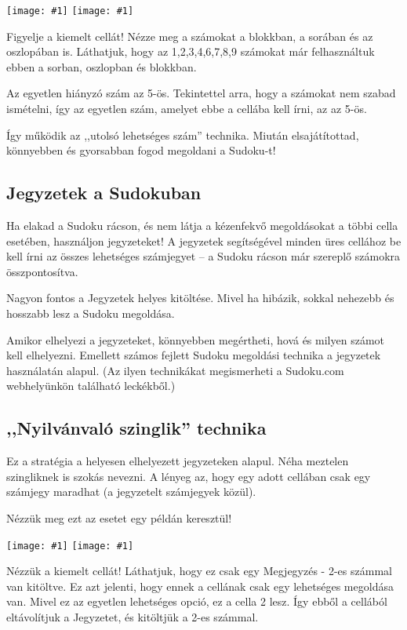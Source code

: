 \documentclass[a4paper,12pt,twoside]{article}
\newcommand{\kep}[1]{\texttt{[image: \#1]}}
\begin{document}
\kep{1646981460-3. Last possible number_1.png}
\kep{1646981459-3. Last possible number_2.png}

Figyelje a kiemelt cellát! Nézze meg a számokat a blokkban, a sorában és az oszlopában is. Láthatjuk, hogy az 1,2,3,4,6,7,8,9 számokat már felhasználtuk ebben a sorban, oszlopban és blokkban.

Az egyetlen hiányzó szám az 5-ös. Tekintettel arra, hogy a számokat nem szabad ismételni, így az egyetlen szám, amelyet ebbe a cellába kell írni, az az 5-ös.

Így működik az ,,utolsó lehetséges szám'' technika. Miután elsajátítottad, könnyebben és gyorsabban fogod megoldani a Sudoku-t!

\subsection{Jegyzetek a Sudokuban}

Ha elakad a Sudoku rácson, és nem látja a kézenfekvő megoldásokat a többi cella esetében, használjon jegyzeteket! A jegyzetek segítségével minden üres cellához be kell írni az összes lehetséges számjegyet – a Sudoku rácson már szereplő számokra összpontosítva.

Nagyon fontos a Jegyzetek helyes kitöltése. Mivel ha hibázik, sokkal nehezebb és hosszabb lesz a Sudoku megoldása.

Amikor elhelyezi a jegyzeteket, könnyebben megértheti, hová és milyen számot kell elhelyezni. Emellett számos fejlett Sudoku megoldási technika a jegyzetek használatán alapul. (Az ilyen technikákat megismerheti a Sudoku.com webhelyünkön található leckékből.)


\subsection{,,Nyilvánvaló szinglik'' technika}

Ez a stratégia a helyesen elhelyezett jegyzeteken alapul. Néha meztelen szingliknek is szokás nevezni. A lényeg az, hogy egy adott cellában csak egy számjegy maradhat (a jegyzetelt számjegyek közül).

Nézzük meg ezt az esetet egy példán keresztül!

\kep{1646982336-5. Obvious singles_1.png}
\kep{1646982336-5. Obvious singles_2.png}

Nézzük a kiemelt cellát! Láthatjuk, hogy ez csak egy Megjegyzés - 2-es számmal van kitöltve. Ez azt jelenti, hogy ennek a cellának csak egy lehetséges megoldása van. Mivel ez az egyetlen lehetséges opció, ez a cella 2 lesz. Így ebből a cellából eltávolítjuk a Jegyzetet, és kitöltjük a 2-es számmal.
\end{document}
